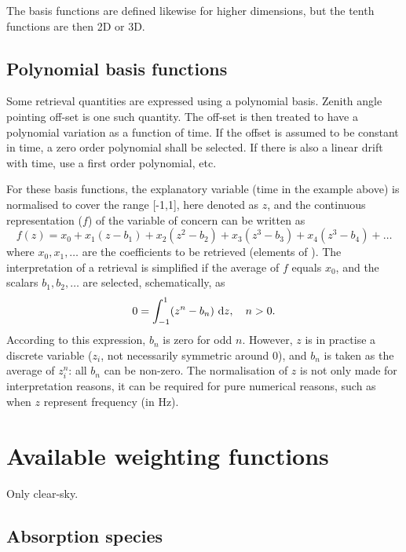 The basis functions are defined likewise for higher dimensions, but the
tenth functions are then 2D or 3D.




\subsection{Polynomial basis functions}
\label{sec:wfuns:basis2}
%
Some retrieval quantities are expressed using a polynomial basis. Zenith angle
pointing off-set is one such quantity. The off-set is then treated to have a
polynomial variation as a function of time. If the offset is assumed to be
constant in time, a zero order polynomial shall be selected. If there is also a
linear drift with time, use a first order polynomial, etc.

For these basis functions, the explanatory variable (time in the example above)
is normalised to cover the range [-1,1], here denoted as $z$, and the
continuous representation ($f$) of the variable of concern can be written as
\begin{equation}
  f(z) = x_0 + x_1(z-b_1) + x_2(z^2-b_2) + x_3(z^3-b_3) + x_4(z^3-b_4) + \dots  
\end{equation}
where $x_0, x_1, \dots$ are the coefficients to be retrieved (elements of
\SttVct). The interpretation of a retrieval is simplified if the average of $f$
equals $x_0$, and the scalars $b_1, b_2, \dots$ are selected, schematically, as
\begin{equation}
  0 = \int_{-1}^1 \!\left(z^n-b_n\right) \, \mathrm{d} z, \quad n>0.
\end{equation}
According to this expression, $b_n$ is zero for odd $n$. However, $z$ is in
practise a discrete variable ($z_i$, not necessarily symmetric around 0), and
$b_n$ is taken as the average of $z_i^n$: all $b_n$ can be non-zero. The
normalisation of $z$ is not only made for interpretation reasons, it can be
required for pure numerical reasons, such as when $z$ represent frequency (in
Hz).



\section{Available weighting functions}
\label{sec:wfuns:aval}

Only clear-sky.


\subsection{Absorption species}
\label{sec:wfuns:absspecies}

